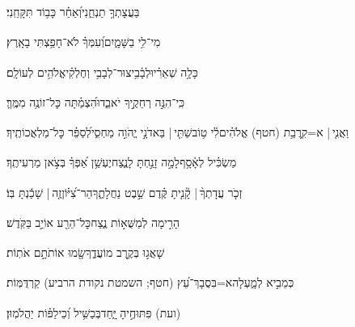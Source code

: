 \documentclass[12pt]{article}
\newcommand{\kri}[1]{\ledsidenote{\small{#1}}}	%
\newcommand{\loc}[1]{\textsuperscript{\locf{#1}}}
\begin{document}
{\loc{ כד}~}‏בַּעֲצָתְךָ֥ תַנְחֵ֑נִי{\hfill}וְ֝אַחַ֗ר כָּב֥וֹד תִּקָּחֵֽנִי׃\par

{\loc{ כה}~}‏מִי־לִ֥י בַשָּׁמָ֑יִם{\hfill}וְ֝עִמְּךָ֗ לֹא־חָפַ֥צְתִּי בָאָֽרֶץ׃\par

{\loc{ כו}~}‏כָּלָ֥ה שְׁאֵרִ֗י{\hfill}וּלְבָ֫בִ֥י\newline\hspace*{.5em}צוּר־לְבָבִ֥י וְחֶלְקִ֗י{\hfill}אֱלֹהִ֥ים לְעוֹלָֽם׃\par

{\loc{ כז}~}‏כִּֽי־הִנֵּ֣ה רְחֵקֶ֣יךָ יֹאבֵ֑דוּ{\hfill}הִ֝צְמַ֗תָּה כׇּל־זוֹנֶ֥ה מִמֶּֽךָּ׃\par

{\loc{ כח}~}‏וַאֲנִ֤י |  א=קִ֥רֲבַ֥ת (חטף) אֱלֹהִ֗ים{\hfill}לִ֫י ט֥וֹב\newline\hspace*{.5em}שַׁתִּ֤י |  בַּאדֹנָ֣י יֱהֹוִ֣ה מַחְסִ֑י{\hfill}לְ֝סַפֵּ֗ר כׇּל־מַלְאֲכוֹתֶֽיךָ׃\par\pend
\ledpb
\pstart[\subsection*{\textcolor{red}{פרק עד}}]\label{פרק עד}
{\loc{ א}~}‏מַשְׂכִּ֗יל לְאָ֫סָ֥ף\newline\hspace*{.5em}לָמָ֣ה  זָנַ֣חְתָּ לָנֶ֑צַח{\hfill}יֶעְשַׁ֥ן אַ֝פְּךָ֗ בְּצֹ֣אן מַרְעִיתֶֽךָ׃\par

{\loc{ ב}~}‏זְכֹ֤ר עֲדָתְךָ֨ |  קָ֘נִ֤יתָ קֶּ֗דֶם{\hfill} שֵׁ֣בֶט נַחֲלָתֶ֑ךָ\newline\hspace*{.5em}הַר־צִ֝יּ֗וֹן{\hfill}זֶ֤ה |  שָׁכַ֬נְתָּ בּֽוֹ׃\par

{\loc{ ג}~}‏הָרִ֣ימָה  לְמַשֻּׁא֣וֹת נֶ֑צַח{\hfill}כׇּל־הֵרַ֖ע אוֹיֵ֣ב בַּקֹּֽדֶשׁ׃\par

{\loc{ ד}~}‏שָׁאֲג֣וּ  בְּקֶ֣רֶב מוֹעֲדֶ֑ךָ{\hfill}שָׂ֖מוּ אוֹתֹתָ֣ם אֹתֽוֹת׃\par

{\loc{ ה}~}‏ כְּמֵבִ֣יא לְמָ֑עְלָה{\hfill}א=בִּסֲבָךְ־עֵ֝ץ (חטף; השמטת נקודת הרביע) קַרְדֻּמּֽוֹת׃\par

{\loc{ ו}~}‏(ועת)\kri{} פִּתּוּחֶ֣יהָ יָּ֑חַד{\hfill}בְּכַשִּׁ֥יל וְ֝כֵילַפּ֗וֹת יַהֲלֹמֽוּן׃\par
\end{document}

